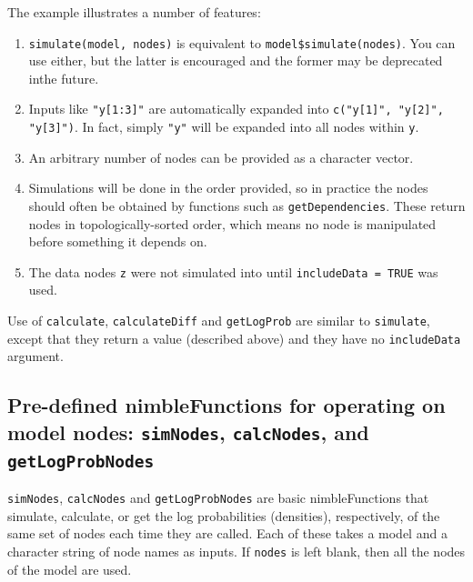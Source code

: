 \documentclass[12pt,oneside]{book}\usepackage[]{graphicx}\usepackage[]{color}
\def\cd#1{\texttt{#1}}
\begin{document}
The example illustrates a number of features:

\begin{enumerate}
\item \cd{simulate(model, nodes)} is equivalent to
  \cd{model\$simulate(nodes)}. You can use either, but the latter is
  encouraged and the former may be deprecated inthe future.
\item Inputs like \cd{"y[1:3]"} are automatically expanded into
  \cd{c("y[1]", "y[2]", "y[3]")}.  In fact, simply \cd{"y"} will be
  expanded into all nodes within \cd{y}.
\item An arbitrary number of nodes can be provided as a character
vector.
\item Simulations will be done in the order provided, so in practice
  the nodes should often be obtained by functions such as
  \cd{getDependencies}.  These return nodes in
  topologically-sorted order, which means no node is manipulated before something
  it depends on.
\item The data nodes \cd{z} were not simulated into until
  \cd{includeData = TRUE} was used.
\end{enumerate}

Use of \cd{calculate}, \cd{calculateDiff} and \cd{getLogProb} are similar to \cd{simulate},
except that they return a value (described above) and they have no \cd{includeData} argument.



\subsection{Pre-defined nimbleFunctions for operating on model nodes: \cd{simNodes}, \cd{calcNodes}, and \cd{getLogProbNodes}}
\label{sec:cdsimn-cdcalcn-cdget}


  \cd{simNodes}, \cd{calcNodes} and \cd{getLogProbNodes} are basic nimbleFunctions that simulate, calculate, or get the log probabilities
  (densities), respectively, of the same set of nodes each time they
  are called.  Each of these 
takes a model and a character string of node names 
  as inputs. If \cd{nodes} is left blank, then all the nodes of the model
  are used. 
  
\end{document}
